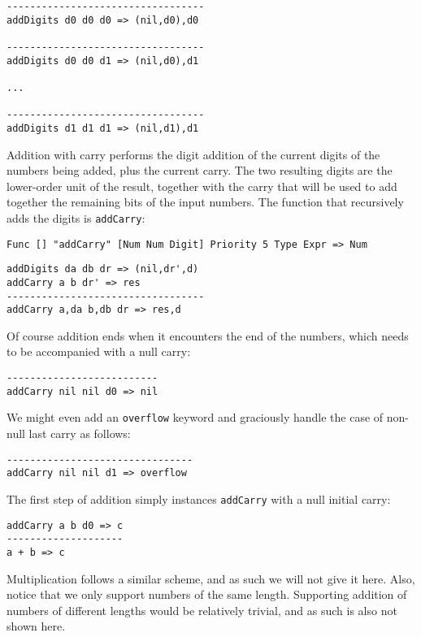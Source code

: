\begin{lstlisting}
----------------------------------
addDigits d0 d0 d0 => (nil,d0),d0

----------------------------------
addDigits d0 d0 d1 => (nil,d0),d1

...

----------------------------------
addDigits d1 d1 d1 => (nil,d1),d1
\end{lstlisting}

Addition with carry performs the digit addition of the current digits of the numbers being added, plus the current carry. The two resulting digits are the lower-order unit of the result, together with the carry that will be used to add together the remaining bits of the input numbers. The function that recursively adds the digits is \texttt{addCarry}:

\begin{lstlisting}
Func [] "addCarry" [Num Num Digit] Priority 5 Type Expr => Num
\end{lstlisting}

\begin{lstlisting}
addDigits da db dr => (nil,dr',d)
addCarry a b dr' => res
----------------------------------
addCarry a,da b,db dr => res,d
\end{lstlisting}

Of course addition ends when it encounters the end of the numbers, which needs to be accompanied with a null carry:

\begin{lstlisting}
--------------------------
addCarry nil nil d0 => nil
\end{lstlisting}

We might even add an \texttt{overflow} keyword and graciously handle the case of non-null last carry as follows:


\begin{lstlisting}
--------------------------------
addCarry nil nil d1 => overflow
\end{lstlisting}

The first step of addition simply instances \texttt{addCarry} with a null initial carry:

\begin{lstlisting}
addCarry a b d0 => c
--------------------
a + b => c
\end{lstlisting}

Multiplication follows a similar scheme, and as such we will not give it here. Also, notice that we only support numbers of the same length. Supporting addition of numbers of different lengths would be relatively trivial, and as such is also not shown here.


